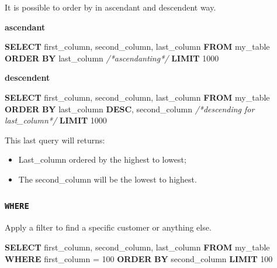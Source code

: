 \documentclass[]{book}
\newenvironment{Shaded}{\begin{snugshade}}{\end{snugshade}}
\newcommand{\KeywordTok}[1]{\textcolor[rgb]{0.13,0.29,0.53}{\textbf{#1}}}
\newcommand{\DecValTok}[1]{\textcolor[rgb]{0.00,0.00,0.81}{#1}}
\newcommand{\CommentTok}[1]{\textcolor[rgb]{0.56,0.35,0.01}{\textit{#1}}}
\newcommand{\NormalTok}[1]{#1}
\providecommand{\tightlist}{%
  \setlength{\itemsep}{0pt}\setlength{\parskip}{0pt}}
\begin{document}
It is possible to order by in ascendant and descendent way.

\textbf{ascendant}

\begin{Shaded}
\begin{Highlighting}[]
\KeywordTok{SELECT}\NormalTok{ first_column, second_column, last_column}
  \KeywordTok{FROM}\NormalTok{ my_table}
\KeywordTok{ORDER} \KeywordTok{BY}\NormalTok{ last_column }\CommentTok{/*ascendanting*/}
\KeywordTok{LIMIT} \DecValTok{1000}
\end{Highlighting}
\end{Shaded}

\textbf{descendent}

\begin{Shaded}
\begin{Highlighting}[]
\KeywordTok{SELECT}\NormalTok{ first_column, second_column, last_column}
  \KeywordTok{FROM}\NormalTok{ my_table}
\KeywordTok{ORDER} \KeywordTok{BY}\NormalTok{ last_column }\KeywordTok{DESC}\NormalTok{, second_column }\CommentTok{/*descending for last_column*/}
\KeywordTok{LIMIT} \DecValTok{1000}
\end{Highlighting}
\end{Shaded}

This last query will returns:

\begin{itemize}
\tightlist
\item
  Last\_column ordered by the highest to lowest;
\item
  The second\_column will be the lowest to highest.
\end{itemize}

\subsubsection{\texorpdfstring{\texttt{WHERE}}{WHERE}}\label{where}

Apply a filter to find a specific customer or anything else.

\begin{Shaded}
\begin{Highlighting}[]
\KeywordTok{SELECT}\NormalTok{ first_column, second_column, last_column}
  \KeywordTok{FROM}\NormalTok{ my_table}
\KeywordTok{WHERE}\NormalTok{ first_column = }\DecValTok{100}
\KeywordTok{ORDER} \KeywordTok{BY}\NormalTok{ second_column}
\KeywordTok{LIMIT} \DecValTok{100}
\end{Highlighting}
\end{Shaded}
\end{document}
